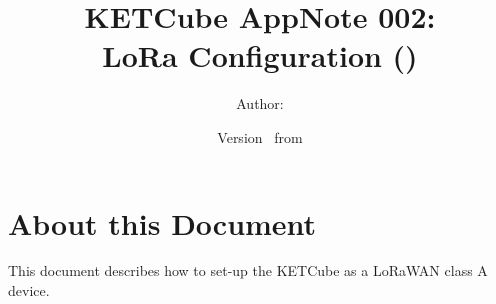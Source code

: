   




\title{\UWBLogo KETCube AppNote 002:\\ LoRa Configuration (\vhCurrentVersion)}

\author{Author: \vhListAllAuthorsLongWithAbbrev}
\date{Version \vhCurrentVersion\ from \vhCurrentDate}

  




  


\section*{About this Document}


This document describes how to set-up the KETCube as a LoRaWAN class A device.


\setcounter{tocdepth}{1}
\tableofcontents
\clearpage

\listoffigures
\listoftables
\begin{versionhistory}
\end{versionhistory}
\setcounter{table}{0}

\clearpage 
{} 
\pagestyle{headings} 

